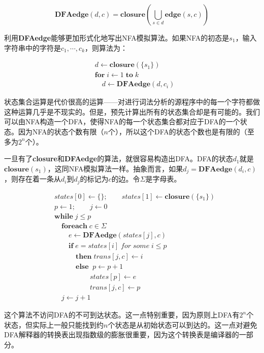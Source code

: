 \documentclass[cn,11pt,chinese]{elegantbook}
\begin{document}
$$
\textbf{DFAedge}(d,c)=\textbf{closure}(\bigcup_{s \in d} \textbf{edge}(s,c))
$$

利用\textbf{DFAedge}能够更加形式化地写出NFA模拟算法。如果NFA的初态是$s_1$，输入字符串中的字符是$c_1,\cdots,c_k$，则算法为：

\begin{align*}
& d \leftarrow \textbf{closure}(\{s_1\}) \\
& \textbf{for} \; \textit{i} \leftarrow 1 \;\textbf{to}\; \textit{k} \\
& \quad d \leftarrow \textbf{DFAedge}(d,c_i)
\end{align*}

状态集合运算是代价很高的运算——对进行词法分析的源程序中的每一个字符都做这种运算几乎是不现实的。但是，预先计算出所有的状态集合却是有可能的。我们可以由NFA构造一个DFA，使得NFA的每一个状态集合都对应于DFA的一个状态。因为NFA的状态个数有限（$n$个），所以这个DFA的状态个数也是有限的（至多为$2^n$个）。

一旦有了\textbf{closure}和\textbf{DFAedge}的算法，就很容易构造出DFA。DFA的状态$d_1$就是$\textbf{closure}(s_1)$，这同NFA模拟算法一样。抽象而言，如果$d_j=\textbf{DFAedge}(d_i,c)$，则存在着一条从$d_i$到$d_j$的标记为$c$的边。令$\Sigma$是字母表。

\begin{align*}
& states[0] \leftarrow \{\}; \quad\quad states[1] \leftarrow \textbf{closure}(\{s_1\}) \\
& p \leftarrow 1; \quad\quad j \leftarrow 0 \\
& \textbf{while} \; j \leq p \\
& \quad \textbf{foreach} \; c \in \Sigma \\
& \quad\quad e \leftarrow \textbf{DFAedge}(states[j],c) \\
& \quad\quad \textbf{if} \; e = states[i] \; for \; some \; i \leq p \\
& \quad\quad\quad \textbf{then} \; trans[j,c] \leftarrow i \\
& \quad\quad\quad \textbf{else} \;\; p \leftarrow p + 1 \\
& \quad\quad\quad\quad\quad states[p] \leftarrow e \\
& \quad\quad\quad\quad\quad trans[j,c] \leftarrow p \\
& \quad j \leftarrow j + 1
\end{align*}

这个算法不访问DFA的不可到达状态。这一点特别重要，因为原则上DFA有$2^n$个状态，但实际上一般只能找到约$n$个状态是从初始状态可以到达的。这一点对避免DFA解释器的转换表出现指数级的膨胀很重要，因为这个转换表是编译器的一部分。
\end{document}
